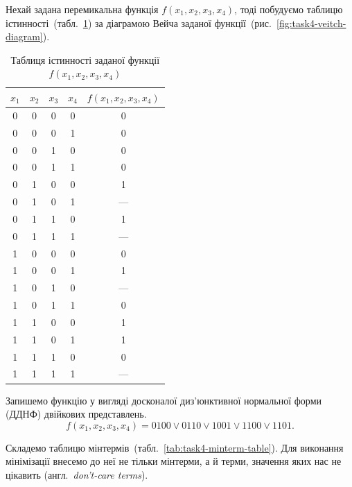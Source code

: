 \documentclass[a4paper,oneside,DIV=12,12pt]{scrartcl}
\newcommand{\langdef}[2]{#1~\textit{#2}}
\begin{document}
	\begin{solution}
		Нехай задана перемикальна функція $f(x_1, x_2, x_3, x_4)$, тоді побудуємо таблицю істинності~(табл.~\ref{tab:task4-function-truth-table}) за діаграмою Вейча заданої функції~(рис.~\ref{fig:task4-veitch-diagram}).
		
		\begin{table}[!htbp]
		\centering
			\begin{tabular}{ccccc}
				\toprule
					$x_1$ & $x_2$ & $x_3$ & $x_4$ & $f(x_1, x_2, x_3, x_4)$ \\
				\midrule
					0     & 0     & 0     & 0     & 0 \\
					0     & 0     & 0     & 1     & 0 \\
					0     & 0     & 1     & 0     & 0 \\
					0     & 0     & 1     & 1     & 0 \\
					0     & 1     & 0     & 0     & 1 \\
					0     & 1     & 0     & 1     & — \\
					0     & 1     & 1     & 0     & 1 \\
					0     & 1     & 1     & 1     & — \\
					1     & 0     & 0     & 0     & 0 \\
					1     & 0     & 0     & 1     & 1 \\
					1     & 0     & 1     & 0     & — \\
					1     & 0     & 1     & 1     & 0 \\
					1     & 1     & 0     & 0     & 1 \\
					1     & 1     & 0     & 1     & 1 \\
					1     & 1     & 1     & 0     & 0 \\
					1     & 1     & 1     & 1     & — \\
				\bottomrule
			\end{tabular}
		\caption{Таблиця істинності заданої функції $f(x_1, x_2, x_3, x_4)$}
		\label{tab:task4-function-truth-table}
		\end{table}
		
		Запишемо функцію у вигляді досконалої диз'\-юн\-ктив\-ної нормальної форми (ДДНФ) двійкових представлень.
		\[
			f(x_1, x_2, x_3, x_4) = 0100 \lor 0110 \lor 1001 \lor 1100 \lor 1101.
		\]
		
		Складемо таблицю мінтермів~(табл.~\ref{tab:task4-minterm-table}). Для виконання мінімізації внесемо до неї не тільки мінтерми, а й терми, значення яких нас не цікавить (\langdef{англ.}{don't-care terms}).
		

\end{solution}
\end{document}
